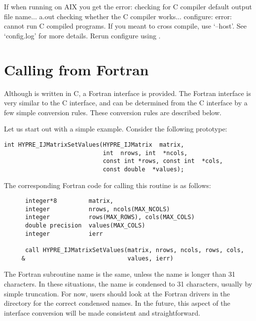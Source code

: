 If when running  on AIX you get the error:
checking for C compiler default output file name... a.out
checking whether the C compiler works... configure: error: cannot run C compiled programs.
If you meant to cross compile, use `--host'.
See `config.log' for more details.
Rerun configure using .


\section{Calling from Fortran}
\label{Calling from Fortran}

Although \hypre{} is written in C, a Fortran interface is provided.
The Fortran interface is very similar to the C interface, and can be
determined from the C interface by a few simple conversion rules.
These conversion rules are described below.

Let us start out with a simple example.  Consider the following
\hypre{} prototype:
\begin{display}
\begin{verbatim}
int HYPRE_IJMatrixSetValues(HYPRE_IJMatrix  matrix,
                            int  nrows, int  *ncols,
                            const int *rows, const int  *cols,
                            const double  *values);
\end{verbatim}
\end{display}
The corresponding Fortran code for calling this routine is as follows:
\begin{display}
\begin{verbatim}
      integer*8         matrix, 
      integer           nrows, ncols(MAX_NCOLS)
      integer           rows(MAX_ROWS), cols(MAX_COLS)
      double precision  values(MAX_COLS)
      integer           ierr

      call HYPRE_IJMatrixSetValues(matrix, nrows, ncols, rows, cols,
     &                             values, ierr)
\end{verbatim}
\end{display}
The Fortran subroutine name is the same, unless the name is longer
than 31 characters.  In these situations, the name is condensed to 31
characters, usually by simple truncation.  For now, users should look
at the Fortran drivers in the  directory for the correct
condensed names.  In the future, this aspect of the interface conversion
will be made consistent and straightforward.

